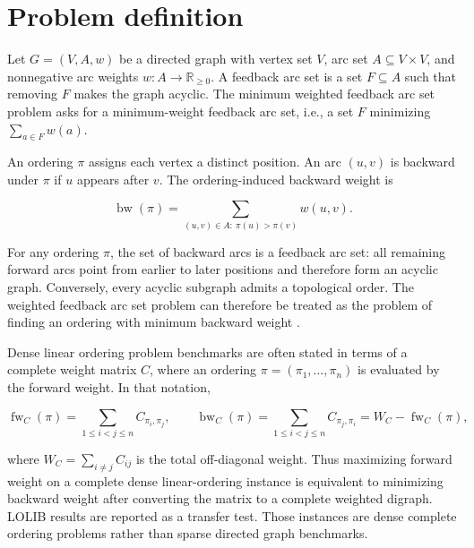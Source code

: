 \section{Problem definition}
\label{sec:problem-definition}

Let \(G=(V,A,w)\) be a directed graph with vertex set \(V\), arc set \(A\subseteq V\times V\), and nonnegative arc weights \(w:A\to \mathbb{R}_{\ge 0}\). A feedback arc set is a set \(F\subseteq A\) such that removing \(F\) makes the graph acyclic. The minimum weighted feedback arc set problem asks for a minimum-weight feedback arc set, i.e., a set \(F\) minimizing \(\sum_{a\in F}w(a)\).

An ordering \(\pi\) assigns each vertex a distinct position. An arc \((u,v)\) is backward under \(\pi\) if \(u\) appears after \(v\). The ordering-induced backward weight is

\begin{equation}
    \operatorname{bw}(\pi)
    =
    \sum_{(u,v)\in A:\ \pi(u)>\pi(v)} w(u,v).
    \label{eq:backward-weight}
\end{equation}

For any ordering \(\pi\), the set of backward arcs is a feedback arc set: all remaining forward arcs point from earlier to later positions and therefore form an acyclic graph. Conversely, every acyclic subgraph admits a topological order. The weighted feedback arc set problem can therefore be treated as the problem of finding an ordering with minimum backward weight \cite{F90,K72}.

Dense linear ordering problem benchmarks are often stated in terms of a complete weight matrix \(C\), where an ordering \(\pi=(\pi_1,\ldots,\pi_n)\) is evaluated by the forward weight. In that notation,

\begin{equation}
    \operatorname{fw}_{C}(\pi)
    =
    \sum_{1\le i<j\le n} C_{\pi_i,\pi_j},
    \qquad
    \operatorname{bw}_{C}(\pi)
    =
    \sum_{1\le i<j\le n} C_{\pi_j,\pi_i}
    =
    W_C-\operatorname{fw}_{C}(\pi),
    \label{eq:lolib-forward-backward}
\end{equation}

where \(W_C=\sum_{i\ne j}C_{ij}\) is the total off-diagonal weight. Thus maximizing forward weight on a complete dense linear-ordering instance is equivalent to minimizing backward weight after converting the matrix to a complete weighted digraph. LOLIB results are reported as a transfer test. Those instances are dense complete ordering problems rather than sparse directed graph benchmarks.
